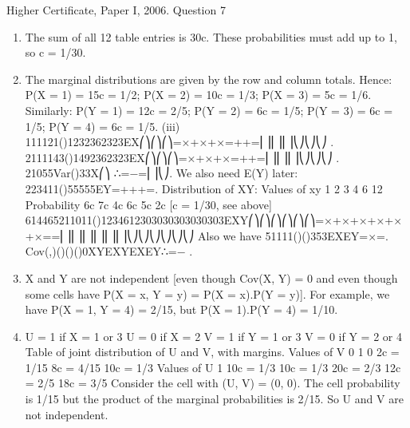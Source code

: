 \documentclass[a4paper,12pt]{article}
\begin{document}
Higher Certificate, Paper I, 2006. Question 7
\begin{enumerate}
\item  The sum of all 12 table entries is 30c. These probabilities must add up to 1, so c = 1/30.
\item  The marginal distributions are given by the row and column totals.
Hence: P(X = 1) = 15c = 1/2; P(X = 2) = 10c = 1/3; P(X = 3) = 5c = 1/6.
Similarly: P(Y = 1) = 12c = 2/5; P(Y = 2) = 6c = 1/5; P(Y = 3) = 6c = 1/5; P(Y = 4) = 6c = 1/5.
(iii) 111121()1232362323EX⎛⎞⎛⎞⎛⎞=×+×+×=++=⎜⎟⎜⎟⎜⎟⎝⎠⎝⎠⎝⎠ .
2111143()1492362323EX⎛⎞⎛⎞⎛⎞=×+×+×=++=⎜⎟⎜⎟⎜⎟⎝⎠⎝⎠⎝⎠ .
21055Var()33X⎛⎞ ∴=−=⎜⎟⎝⎠.
We also need E(Y) later: 223411()55555EY=+++=.
Distribution of XY:
Values of xy
1
2
3
4
6
12
Probability
6c
7c
4c
6c
5c
2c
[c = 1/30, see above]
614465211011()1234612303030303030303EXY⎛⎞⎛⎞⎛⎞⎛⎞⎛⎞⎛⎞=×+×+×+×+×+×==⎜⎟⎜⎟⎜⎟⎜⎟⎜⎟⎜⎟⎝⎠⎝⎠⎝⎠⎝⎠⎝⎠⎝⎠
Also we have 51111()()353EXEY=×=.
Cov(,)()()()0XYEXYEXEY∴=− .
\item  X and Y are not independent [even though Cov(X, Y) = 0 and even though some cells have P(X = x, Y = y) = P(X = x).P(Y = y)]. For example, we have P(X = 1, Y = 4) = 2/15, but P(X = 1).P(Y = 4) = 1/10.
\item  U = 1 if X = 1 or 3 U = 0 if X = 2
V = 1 if Y = 1 or 3 V = 0 if Y = 2 or 4
Table of joint distribution of U and V, with margins.
Values of V
0
1
0
2c = 1/15
8c = 4/15
10c = 1/3
Values of U
1
10c = 1/3
10c = 1/3
20c = 2/3
12c = 2/5
18c = 3/5
Consider the cell with (U, V) = (0, 0). The cell probability is 1/15 but the product of the marginal probabilities is 2/15. So U and V are not independent.
\end{enumerate}
\end{document}
